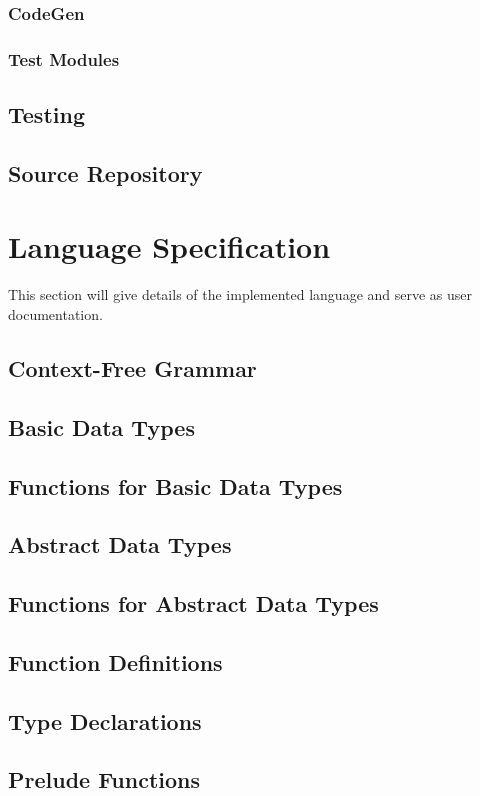 \documentclass{article}
\begin{document}
\subsubsection{CodeGen}
\subsubsection{Test Modules}

\subsection{Testing}
\subsection{Source Repository}

\pagebreak
\section{Language Specification}
This section will give details of the implemented language and serve as user documentation.
\subsection{Context-Free Grammar}
\subsection{Basic Data Types}
\subsection{Functions for Basic Data Types}
\subsection{Abstract Data Types}
\subsection{Functions for Abstract Data Types}
\subsection{Function Definitions}
\subsection{Type Declarations}
\subsection{Prelude Functions}
\end{document}
